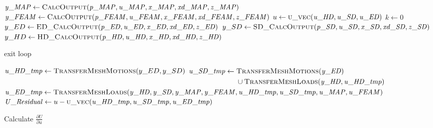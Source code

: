 \documentclass[10pt,letterpaper,oneside,notitlepage]{article}
\begin{document}
\begin{algorithmic}[1]

	\State
	\State $\mathit{y\_MAP}  \gets \Call{CalcOutput}{\mathit{p\_MAP},\mathit{u\_MAP},\mathit{x\_MAP},\mathit{xd\_MAP},\mathit{z\_MAP}}$ 
	\State $\mathit{y\_FEAM} \gets \Call{CalcOutput}{\mathit{p\_FEAM},\mathit{u\_FEAM},\mathit{x\_FEAM},\mathit{xd\_FEAM},\mathit{z\_FEAM}}$
	\State
	\State{}
	\State
	\State $u \gets \Call{u\_vec}{\mathit{u\_HD},\mathit{u\_SD},\mathit{u\_ED}}$
	\State $k \gets 0$
	\Loop{}
		\State $y\_ED \gets \Call{ED\_CalcOutput}{\mathit{p\_ED},\mathit{u\_ED},\mathit{x\_ED},\mathit{xd\_ED},\mathit{z\_ED}}$
		\State $y\_SD \gets \Call{SD\_CalcOutput}{\mathit{p\_SD},\mathit{u\_SD},\mathit{x\_SD},\mathit{xd\_SD},\mathit{z\_SD}}$
		\State $y\_HD \gets \Call{HD\_CalcOutput}{\mathit{p\_HD},\mathit{u\_HD},\mathit{x\_HD},\mathit{xd\_HD},\mathit{z\_HD}}$
	
			\State exit loop
		\EndIf
		
		\State$\mathit{u\_HD\_tmp} \gets \Call{TransferMeshMotions}{y\_ED,y\_SD}$
		\State$\mathit{u\_SD\_tmp} \gets \!
				\begin{aligned}[t]
           & \Call{TransferMeshMotions}{\mathit{y\_ED}}  \\
					 & \cup \Call{TransferMeshLoads}{\mathit{y\_HD},\mathit{u\_HD\_tmp}}
			\end{aligned}$
		\State$\mathit{u\_ED\_tmp} \gets \Call{TransferMeshLoads}{\mathit{y\_HD},     \mathit{y\_SD},\mathit{y\_MAP},\mathit{y\_FEAM},
		                                                     \mathit{u\_HD\_tmp},\mathit{u\_SD\_tmp},\mathit{u\_MAP},\mathit{u\_FEAM}}$
		\State
		\State$\mathit{U\_Residual} \gets u - \Call{u\_vec}{\mathit{u\_HD\_tmp},\mathit{u\_SD\_tmp},\mathit{u\_ED\_tmp}}$
		\State
		
			\State Calculate $\frac{\partial U}{\partial u}$
		\EndIf
		


\end{algorithmic}
\end{document}
